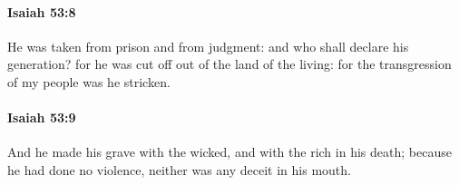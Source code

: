 		\paragraph{Isaiah 53:8} %
			\label{ISAIAH-53-8}

			He was taken from prison and from judgment: and who shall declare his generation? for he was cut off out of the land of the living: for the transgression of my people was he stricken.


		\paragraph{Isaiah 53:9} %
			\label{ISAIAH-53-9}

			And he made his grave with the wicked, and with the rich in his death; because he had done no violence, neither was any deceit in his mouth.


